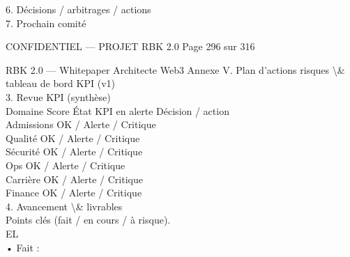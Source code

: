 \vspace{0.5em}
6. Décisions / arbitrages / actions\\
\vspace{0.5em}
7. Prochain comité\\
\vspace{0.5em}
\vspace{0.5em}
\vspace{0.5em}
\vspace{0.5em}
\begin{confidential}CONFIDENTIEL — PROJET RBK 2.0                                                                  Page 296 sur 316\end{confidential}
RBK 2.0 — Whitepaper Architecte Web3                                                   Annexe V. Plan d’actions risques \textbackslash{}& tableau de bord KPI (v1)\\
\vspace{0.5em}
\vspace{0.5em}
3. Revue KPI (synthèse)\\
\vspace{0.5em}
Domaine      Score        État                             KPI en alerte              Décision / action\\
Admissions                OK / Alerte / Critique\\
Qualité                   OK / Alerte / Critique\\
Sécurité                  OK / Alerte / Critique\\
Ops                       OK / Alerte / Critique\\
Carrière                  OK / Alerte / Critique\\
Finance                   OK / Alerte / Critique\\
\vspace{0.5em}
\vspace{0.5em}
\vspace{0.5em}
4. Avancement \textbackslash{}& livrables\\
Points clés (fait / en cours / à risque).\\
\vspace{0.5em}
\vspace{0.5em}
\vspace{0.5em}
\vspace{0.5em}
EL\\
• Fait :\\
\vspace{0.5em}
\vspace{0.5em}
\vspace{0.5em}
